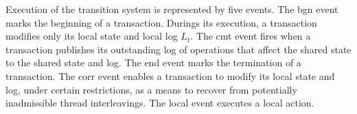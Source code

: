 %
Execution of the transition system is represented by five events.
The {\sf bgn} event marks the beginning of a transaction.
Durings its execution, a transaction modifies only its local state and local log $L_t$.
%
The {\sf cmt} event fires when a transaction publishes its outstanding log of operations that affect the shared state to the shared state and log.
The {\sf end} event marks the termination of a transaction.
The {\sf corr} event enables a transaction to modify its local state and log, under certain restrictions, as a means to recover from potentially inadmissible thread interleavings.
The {\sf local} event executes a local action.

